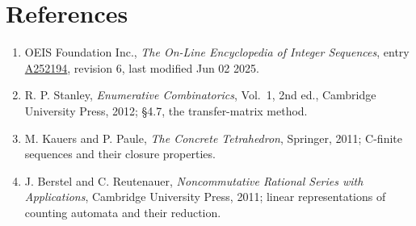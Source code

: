 \documentclass[11pt]{article}
\theoremstyle{definition}
\begin{document}
\section{References}

\begin{enumerate}

\item OEIS Foundation Inc., \emph{The On-Line Encyclopedia of Integer Sequences}, entry \href{https://oeis.org/A252194}{A252194}, revision 6, last modified Jun 02 2025.

\item R. P. Stanley, \emph{Enumerative Combinatorics}, Vol.~1, 2nd ed., Cambridge University Press, 2012; \S4.7, the transfer-matrix method.

\item M. Kauers and P. Paule, \emph{The Concrete Tetrahedron}, Springer, 2011; C-finite sequences and their closure properties.

\item J. Berstel and C. Reutenauer, \emph{Noncommutative Rational Series with Applications}, Cambridge University Press, 2011; linear representations of counting automata and their reduction.

\end{enumerate}
\end{document}
